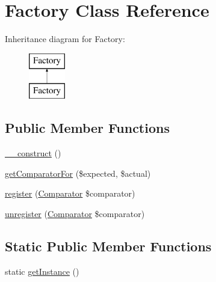 \hypertarget{class_sebastian_bergmann_1_1_comparator_1_1_factory}{}\section{Factory Class Reference}
\label{class_sebastian_bergmann_1_1_comparator_1_1_factory}
Inheritance diagram for Factory\+:\begin{figure}[H]
\begin{center}
\leavevmode
\includegraphics[height=2.000000cm]{class_sebastian_bergmann_1_1_comparator_1_1_factory}
\end{center}
\end{figure}
\subsection*{Public Member Functions}
\begin{DoxyCompactItemize}
\item 
\mbox{\hyperlink{class_sebastian_bergmann_1_1_comparator_1_1_factory_a095c5d389db211932136b53f25f39685}{\+\_\+\+\_\+construct}} ()
\item 
\mbox{\hyperlink{class_sebastian_bergmann_1_1_comparator_1_1_factory_ae9c794c946940961506ff398fad93133}{get\+Comparator\+For}} (\$expected, \$actual)
\item 
\mbox{\hyperlink{class_sebastian_bergmann_1_1_comparator_1_1_factory_ad375a6b8e3b1ad05beaf311b6c05d4d6}{register}} (\mbox{\hyperlink{class_sebastian_bergmann_1_1_comparator_1_1_comparator}{Comparator}} \$comparator)
\item 
\mbox{\hyperlink{class_sebastian_bergmann_1_1_comparator_1_1_factory_a52e6511e6a6737ca95bc42fa9ff0f07e}{unregister}} (\mbox{\hyperlink{class_sebastian_bergmann_1_1_comparator_1_1_comparator}{Comparator}} \$comparator)
\end{DoxyCompactItemize}
\subsection*{Static Public Member Functions}
\begin{DoxyCompactItemize}
\item 
static \mbox{\hyperlink{class_sebastian_bergmann_1_1_comparator_1_1_factory_ac93fbec81f07e5d15f80db907e63dc10}{get\+Instance}} ()
\end{DoxyCompactItemize}


